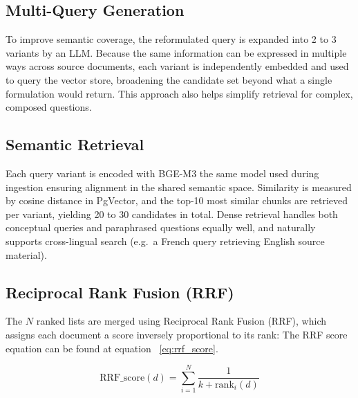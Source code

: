 \subsection{Multi-Query Generation}

To improve semantic coverage, the reformulated query is expanded into 2 to 3
variants by an LLM. Because the same information can be expressed in multiple
ways across source documents, each variant is independently embedded and used
to query the vector store, broadening the candidate set beyond what a single
formulation would return. This approach also helps simplify retrieval for complex, composed questions.

\subsection{Semantic Retrieval}

Each query variant is encoded with BGE-M3 the same model used during
ingestion ensuring alignment in the shared semantic space. Similarity is
measured by cosine distance in PgVector, and the top-10 most similar chunks
are retrieved per variant, yielding 20 to 30 candidates in total. Dense
retrieval handles both conceptual queries and paraphrased questions equally
well, and naturally supports cross-lingual search (e.g.\ a French query
retrieving English source material).

\subsection{Reciprocal Rank Fusion (RRF)}

The $N$ ranked lists are merged using Reciprocal Rank Fusion (RRF),
which assigns each document a score inversely proportional to its rank: The RRF score equation can be found at equation ~\ref{eq:rrf_score}.

\begin{equation}
\mathrm{RRF\_score}(d) =
\sum_{i=1}^{N} \frac{1}{k + \mathrm{rank}_i(d)}
\label{eq:rrf_score}
\end{equation}

